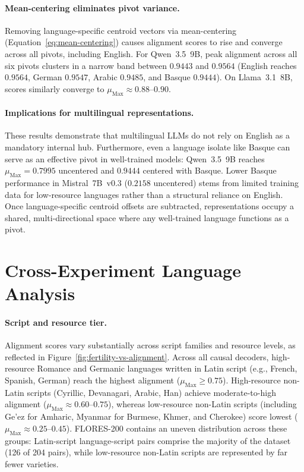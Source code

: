 \paragraph{Mean-centering eliminates pivot variance.}
Removing language-specific centroid vectors via mean-centering (Equation~\ref{eq:mean-centering}) causes alignment scores to rise and converge across all pivots, including English. For Qwen~3.5~9B, peak alignment across all six pivots clusters in a narrow band between $0.9443$ and $0.9564$ (English reaches $0.9564$, German $0.9547$, Arabic $0.9485$, and Basque $0.9444$). On Llama~3.1~8B, scores similarly converge to $\mu_{\text{Max}} \approx 0.88$--$0.90$.

\paragraph{Implications for multilingual representations.}
These results demonstrate that multilingual LLMs do not rely on English as a mandatory internal hub. Furthermore, even a language isolate like Basque can serve as an effective pivot in well-trained models: Qwen~3.5~9B reaches $\mu_{\text{Max}} = 0.7995$ uncentered and $0.9444$ centered with Basque. Lower Basque performance in Mistral~7B~v0.3 ($0.2158$ uncentered) stems from limited training data for low-resource languages rather than a structural reliance on English. Once language-specific centroid offsets are subtracted, representations occupy a shared, multi-directional space where any well-trained language functions as a pivot.

\section{Cross-Experiment Language Analysis}
\label{sec:results-cross-experiment}

\paragraph{Script and resource tier.}
Alignment scores vary substantially across script families and resource levels, as reflected in Figure~\ref{fig:fertility-vs-alignment}. Across all causal decoders, high-resource Romance and Germanic languages written in Latin script (e.g., French, Spanish, German) reach the highest alignment ($\mu_{\text{Max}} \ge 0.75$). High-resource non-Latin scripts (Cyrillic, Devanagari, Arabic, Han) achieve moderate-to-high alignment ($\mu_{\text{Max}} \approx 0.60$--$0.75$), whereas low-resource non-Latin scripts (including Ge'ez for Amharic, Myanmar for Burmese, Khmer, and Cherokee) score lowest ($\mu_{\text{Max}} \approx 0.25$--$0.45$). FLORES-200 contains an uneven distribution across these groups: Latin-script language-script pairs comprise the majority of the dataset (126 of 204 pairs), while low-resource non-Latin scripts are represented by far fewer varieties.


